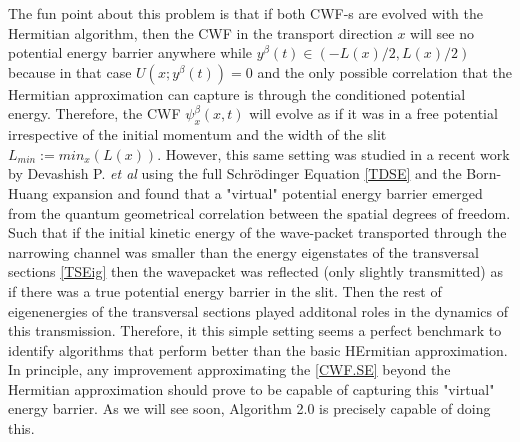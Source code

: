 \documentclass[11pt, a4paper]{article} %
\begin{document}
The fun point about this problem is that if both CWF-s are evolved with the Hermitian algorithm, then the CWF in the transport direction $x$ will see no potential energy barrier anywhere while $y^\beta(t)\in(-L(x)/2,L(x)/2)$ because in that case $U(x;y^\beta(t))=0$ and the only possible correlation that  the Hermitian approximation can capture is through the conditioned potential energy. Therefore, the CWF $\psi^\beta_x(x,t)$ will evolve as if it was in a free potential irrespective of the initial momentum and the width of the slit $L_{min}:=min_x(L(x))$. However, this same setting was studied in a recent work by Devashish P. {\em et al} \cite{Dev} using the full Schrödinger Equation \ref{TDSE} and the Born-Huang expansion and found that a "virtual" potential energy barrier emerged from the quantum geometrical correlation between the spatial degrees of freedom. Such that if the initial kinetic energy of the wave-packet transported through the narrowing channel was smaller than the energy eigenstates of the transversal sections \ref{TSEig} then the wavepacket was reflected (only slightly transmitted) as if there was a true potential energy barrier in the slit. Then the rest of eigenenergies of the transversal sections played additonal roles in the dynamics of this transmission. Therefore, it this simple setting seems a perfect benchmark to identify algorithms that perform better than the basic HErmitian approximation. In principle, any improvement approximating the \ref{CWF.SE} beyond the Hermitian approximation should prove to be capable of capturing this "virtual" energy barrier. As we will see soon, Algorithm 2.0 is precisely capable of doing this. 
\end{document}
